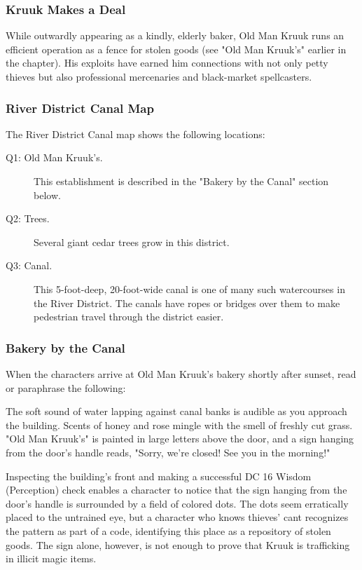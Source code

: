 \documentclass[letterpaper, 11pt, bg=full, twocolumn]{dndbook}
\begin{document}
\subsubsection{Kruuk Makes a Deal}

While outwardly appearing as a kindly, elderly baker, Old Man Kruuk runs an efficient operation as a fence for stolen goods (see "Old Man Kruuk's" earlier in the chapter). His exploits have earned him connections with not only petty thieves but also professional mercenaries and black-market spellcasters.

\subsubsection{River District Canal Map}

The River District Canal map shows the following locations:

\begin{description}
\item[Q1: Old Man Kruuk's.] This establishment is described in the "Bakery by the Canal" section below.
\item[Q2: Trees.] Several giant cedar trees grow in this district.
\item[Q3: Canal.] This 5-foot-deep, 20-foot-wide canal is one of many such watercourses in the River District. The canals have ropes or bridges over them to make pedestrian travel through the district easier.
\end{description}



\subsubsection{Bakery by the Canal}

When the characters arrive at Old Man Kruuk's bakery shortly after sunset, read or paraphrase the following:

\begin{DndReadAloud}
The soft sound of water lapping against canal banks is audible as you approach the building. Scents of honey and rose mingle with the smell of freshly cut grass. "Old Man Kruuk's" is painted in large letters above the door, and a sign hanging from the door's handle reads, "Sorry, we're closed! See you in the morning!"
\end{DndReadAloud}

Inspecting the building's front and making a successful DC 16 Wisdom (Perception) check enables a character to notice that the sign hanging from the door's handle is surrounded by a field of colored dots. The dots seem erratically placed to the untrained eye, but a character who knows thieves' cant recognizes the pattern as part of a code, identifying this place as a repository of stolen goods. The sign alone, however, is not enough to prove that Kruuk is trafficking in illicit magic items.
\end{document}
